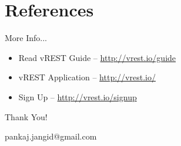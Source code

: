 \documentclass{beamer}
\begin{document}
\section{References}
\begin{frame}{More Info...}
    \begin{itemize}
        \item Read vREST Guide -- \href{http://vrest.io/guide}{http://vrest.io/guide}
        \item vREST Application -- \href{http://vrest.io/}{http://vrest.io/}
        \item Sign Up -- \href{http://vrest.io/signup}{http://vrest.io/signup}
    \end{itemize}
\end{frame}
\begin{frame}[plain,c]
    \begin{center}
        \huge Thank You! 
    \end{center}
    \begin{center}
        \small pankaj.jangid@gmail.com
    \end{center}
\end{frame}
\end{document}
